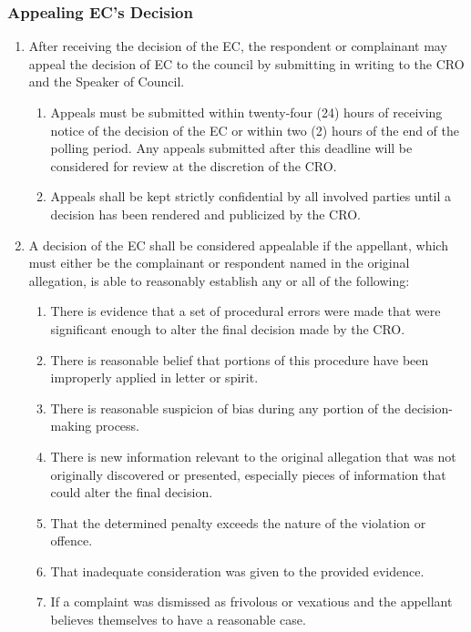     \subsubsection{Appealing EC's Decision}
		\begin{enumerate}
			\item After receiving the decision of the EC, the respondent or complainant may appeal the decision of EC to the council by submitting in writing to the CRO and the Speaker of Council.
				\begin{enumerate}
					\item Appeals must be submitted within twenty-four (24) hours of receiving notice of the decision of the EC or within two (2) hours of the end of the polling period. Any appeals submitted after this deadline will be considered for review at the discretion of the CRO.
					\item Appeals shall be kept strictly confidential by all involved parties until a decision has been rendered and publicized by the CRO.
				\end{enumerate}
			\item A decision of the EC shall be considered appealable if the appellant, which must either be the complainant or respondent named in the original allegation, is able to reasonably establish any or all of the following:
				\begin{enumerate}
					\item There is evidence that a set of procedural errors were made that were significant enough to alter the final decision made by the CRO.
					\item There is reasonable belief that portions of this procedure have been improperly applied in letter or spirit.
					\item There is reasonable suspicion of bias during any portion of the decision-making process.
					\item There is new information relevant to the original allegation that was not originally discovered or presented, especially pieces of information that could alter the final decision.
					\item That the determined penalty exceeds the nature of the violation or offence.
					\item That inadequate consideration was given to the provided evidence.
					\item If a complaint was dismissed as frivolous or vexatious and the appellant believes themselves to have a reasonable case.
				\end{enumerate}

\end{enumerate}
